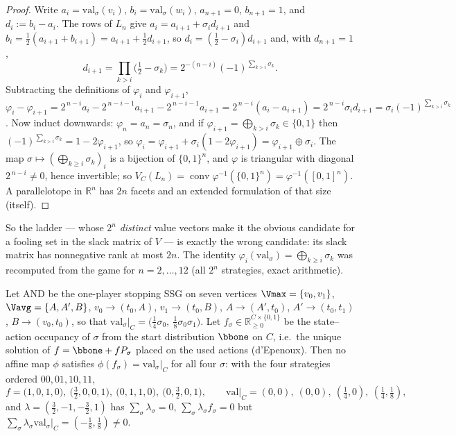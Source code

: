\begin{proof}
Write $a_i=\mathrm{val}_\sigma(v_i)$, $b_i=\mathrm{val}_\sigma(w_i)$, $a_{n+1}=0$, $b_{n+1}=1$,
and $d_i:=b_i-a_i$.  The rows of $L_n$ give $a_i=a_{i+1}+\sigma_id_{i+1}$ and
$b_i=\tfrac12(a_{i+1}+b_{i+1})=a_{i+1}+\tfrac12d_{i+1}$, so
$d_i=(\tfrac12-\sigma_i)d_{i+1}$ and, with $d_{n+1}=1$,
\[
   d_{i+1}=\prod_{k>i}\bigl(\tfrac12-\sigma_k\bigr)=2^{-(n-i)}(-1)^{\sum_{k>i}\sigma_k}.
\]
Subtracting the definitions of $\varphi_i$ and $\varphi_{i+1}$,
$\varphi_i-\varphi_{i+1}=2^{\,n-i}a_i-2^{\,n-i-1}a_{i+1}-2^{\,n-i-1}a_{i+1}
=2^{\,n-i}(a_i-a_{i+1})=2^{\,n-i}\sigma_id_{i+1}=\sigma_i(-1)^{\sum_{k>i}\sigma_k}$.
Now induct downwards: $\varphi_n=a_n=\sigma_n$, and if
$\varphi_{i+1}=\bigoplus_{k>i}\sigma_k\in\{0,1\}$ then
$(-1)^{\sum_{k>i}\sigma_k}=1-2\varphi_{i+1}$, so
$\varphi_i=\varphi_{i+1}+\sigma_i(1-2\varphi_{i+1})=\varphi_{i+1}\oplus\sigma_i$.  The map
$\sigma\mapsto(\bigoplus_{k\ge i}\sigma_k)_i$ is a bijection of $\{0,1\}^{n}$, and $\varphi$ is
triangular with diagonal $2^{\,n-i}\ne0$, hence invertible; so
$V_C(L_n)=\operatorname{conv}\varphi^{-1}(\{0,1\}^{n})=\varphi^{-1}([0,1]^{n})$.  A parallelotope
in $\mathbb R^{n}$ has $2n$ facets and an extended formulation of that size (itself).
\end{proof}

\begin{remark}\label{xc:ladder-remark}
So the ladder --- whose $2^{n}$ \emph{distinct} value vectors make it the obvious candidate for
a fooling set in the slack matrix of $V$ --- is exactly the wrong candidate: its slack matrix
has nonnegative rank at most $2n$.  The identity
$\varphi_i(\mathrm{val}_\sigma)=\bigoplus_{k\ge i}\sigma_k$ was recomputed from the game for
$n=2,\dots,12$ (all $2^{n}$ strategies, exact arithmetic).
\end{remark}

\begin{proposition}\label{xc:occ}
Let $\mathrm{AND}$ be the one-player stopping SSG on seven vertices
$\Vmax=\{v_0,v_1\}$, $\Vavg=\{A,A',B\}$, $v_0\to(t_0,A)$, $v_1\to(t_0,B)$, $A\to(A',t_0)$,
$A'\to(t_0,t_1)$, $B\to(v_0,t_0)$, so that
$\mathrm{val}_\sigma|_{C}=\bigl(\tfrac14\sigma_0,\ \tfrac18\sigma_0\sigma_1\bigr)$.  Let
$f_\sigma\in\mathbb R^{C\times\{0,1\}}_{\ge0}$ be the state--action occupancy of $\sigma$ from
the start distribution $\bbone$ on $C$, i.e.\ the unique solution of
$f=\bbone+f P_\sigma$ placed on the used actions (d'Epenoux).  Then no affine map $\phi$
satisfies $\phi(f_\sigma)=\mathrm{val}_\sigma|_{C}$ for all four $\sigma$: with the four
strategies ordered $00,01,10,11$,
\[
  f=\bigl(1,0,1,0\bigr),\ \bigl(\tfrac32,0,0,1\bigr),\ \bigl(0,1,1,0\bigr),\
  \bigl(0,\tfrac32,0,1\bigr),\qquad
  \mathrm{val}|_C=(0,0),\ (0,0),\ (\tfrac14,0),\ (\tfrac14,\tfrac18),
\]
and $\lambda=(\tfrac32,-1,-\tfrac32,1)$ has $\sum_\sigma\lambda_\sigma=0$,
$\sum_\sigma\lambda_\sigma f_\sigma=0$ but
$\sum_\sigma\lambda_\sigma\mathrm{val}_\sigma|_{C}=(-\tfrac18,\tfrac18)\ne0$.
\end{proposition}

